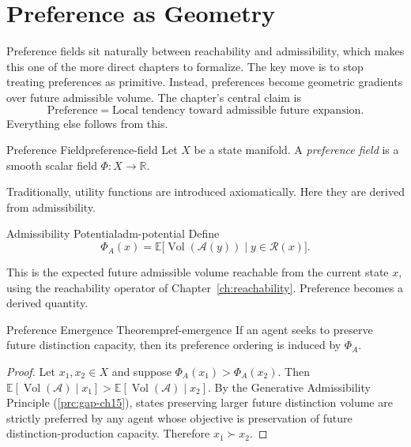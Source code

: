 \documentclass[12pt,twoside,openright]{book}
\newcommand{\reach}{\mathcal{R}}
\newcommand{\adm}{\mathcal{A}}
\newcommand{\Vol}{\operatorname{Vol}}
\begin{document}
\section{Preference as Geometry}
\label{sec:ch22-geometry}

Preference fields sit naturally between reachability and
admissibility, which makes this one of the more direct
chapters to formalize. The key move is to stop treating
preferences as primitive. Instead, preferences become
geometric gradients over future admissible volume. The
chapter's central claim is
\[
  \text{Preference} =
  \text{Local tendency toward admissible future expansion}.
\]
Everything else follows from this.

\begin{definition}{Preference Field}{preference-field}
  Let $X$ be a state manifold. A \emph{preference field} is
  a smooth scalar field $\Phi : X \to \mathbb{R}$.
\end{definition}

Traditionally, utility functions are introduced
axiomatically. Here they are derived from admissibility.

\begin{definition}{Admissibility Potential}{adm-potential}
  Define
  \[
    \Phi_A(x)
    = \mathbb{E}\bigl[
        \Vol(\adm(y)) \mid y \in \reach(x)
      \bigr].
  \]
\end{definition}

This is the expected future admissible volume reachable
from the current state $x$, using the reachability operator
of Chapter~\ref{ch:reachability}. Preference becomes a
derived quantity.

\begin{theorem}{Preference Emergence Theorem}{pref-emergence}
  If an agent seeks to preserve future distinction capacity,
  then its preference ordering is induced by $\Phi_A$.
\end{theorem}

\begin{proof}
  Let $x_1, x_2 \in X$ and suppose
  $\Phi_A(x_1) > \Phi_A(x_2)$. Then
  $\mathbb{E}[\Vol(\adm) \mid x_1] > \mathbb{E}[\Vol(\adm) \mid x_2]$.
  By the Generative Admissibility Principle
  (\cref{prc:gap-ch15}), states preserving larger future
  distinction volume are strictly preferred by any agent
  whose objective is preservation of future
  distinction-production capacity. Therefore $x_1 \succ x_2$.
\end{proof}
\end{document}
